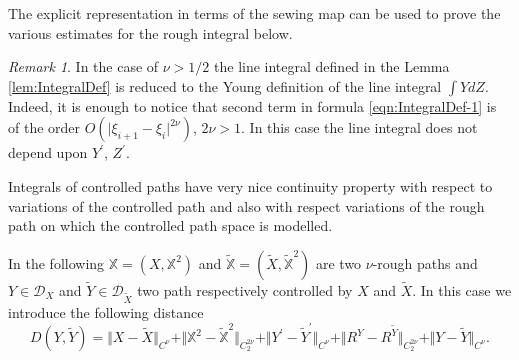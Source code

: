 \documentclass[11pt,a4paper,reqno]{amsart}%
\theoremstyle{plain}
\theoremstyle{remark}
\newtheorem{remark}[theorem]{Remark}
\theoremstyle{plain}
\numberwithin{equation}{section}
\begin{document}
The explicit representation in terms of the sewing map can be used to prove the various estimates for the rough integral below.
\begin{remark}\label{rem:SmoothCase}
In the case of $\nu>1/2$ the line integral defined in the
Lemma \ref{lem:IntegralDef} is reduced to the Young definition of the
line integral $\int YdZ$. Indeed, it is enough to notice that
second term in formula \eqref{eqn:IntegralDef-1} is of the order
$O(\vert \xi_{i+1}-\xi_i\vert^{2\nu})$, $2\nu>1$. In this case the line integral
does not depend upon $Y^\prime$, $Z^\prime$.
\end{remark}

Integrals of controlled paths have very nice continuity property with respect to variations of the controlled path and also with respect variations of the  rough path on which the controlled path space is modelled. 

In the following $\mathbb{X}=(X,\mathbb{X}^2)$ and $\tilde{\mathbb{X}}=(\tilde{X},\tilde{\mathbb{X}}^2)$ are two $\nu$-rough paths and  $Y\in\mathcal{D}_X$ and $\tilde{Y}\in\mathcal{D}_{\tilde{X}}$ two path respectively controlled by $X$ and $\tilde X$. In this case we introduce the following distance
$$
D(Y,\tilde{Y}) = \Vert X-\tilde{X}\Vert_{C^{\nu}}+\Vert \mathbb{X}^2-\mathbb{\tilde{X}}^2\Vert_{C_2^{2\nu}}+\Vert Y^\prime-\tilde{Y}^\prime\Vert_{C^{\nu}}+\Vert R^Y-R^{\tilde{Y}}\Vert_{C_2^{2\nu}}+\Vert Y-\tilde{Y}\Vert_{C^{\nu}}.
$$
\end{document}

